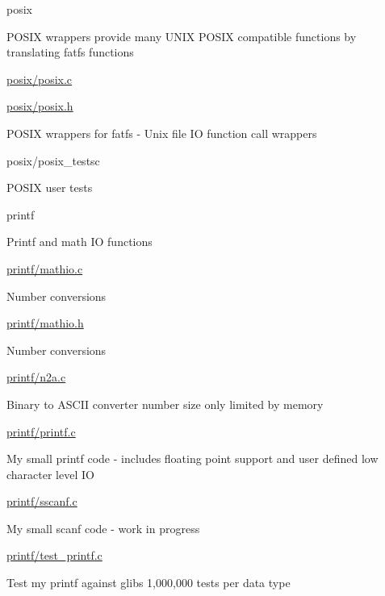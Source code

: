 posix
\begin{DoxyItemize}
\item P\+O\+S\+IX wrappers provide many U\+N\+IX P\+O\+S\+IX compatible functions by translating fatfs functions
\item \hyperlink{posix_8c}{posix/posix.\+c}
\item \hyperlink{posix_8h}{posix/posix.\+h}
\begin{DoxyItemize}
\item P\+O\+S\+IX wrappers for fatfs -\/ Unix file IO function call wrappers
\end{DoxyItemize}
\item posix/posix\+\_\+testsc
\begin{DoxyItemize}
\item P\+O\+S\+IX user tests
\end{DoxyItemize}
\end{DoxyItemize}

printf
\begin{DoxyItemize}
\item Printf and math IO functions
\item \hyperlink{mathio_8c}{printf/mathio.\+c}
\begin{DoxyItemize}
\item Number conversions
\end{DoxyItemize}
\item \hyperlink{mathio_8h}{printf/mathio.\+h}
\begin{DoxyItemize}
\item Number conversions
\end{DoxyItemize}
\item \hyperlink{n2a_8c}{printf/n2a.\+c}
\begin{DoxyItemize}
\item Binary to A\+S\+C\+II converter number size only limited by memory
\end{DoxyItemize}
\item \hyperlink{printf_8c}{printf/printf.\+c}
\begin{DoxyItemize}
\item My small printf code -\/ includes floating point support and user defined low character level IO
\end{DoxyItemize}
\item \hyperlink{sscanf_8c}{printf/sscanf.\+c}
\begin{DoxyItemize}
\item My small scanf code -\/ work in progress
\end{DoxyItemize}
\item \hyperlink{test__printf_8c}{printf/test\+\_\+printf.\+c}
\begin{DoxyItemize}
\item Test my printf against glibs 1,000,000 tests per data type
\end{DoxyItemize}
\end{DoxyItemize}

